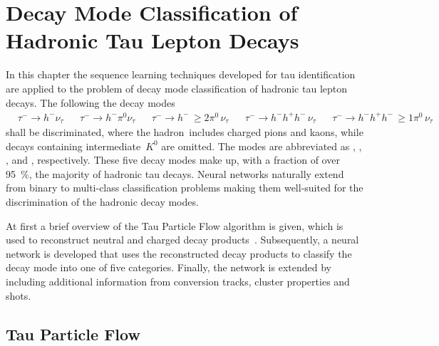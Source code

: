 \chapter{Decay Mode Classification of Hadronic Tau Lepton Decays}
\label{sec:decaymode}

In this chapter the sequence learning techniques developed for tau
identification are applied to the problem of decay mode classification of
hadronic tau lepton decays. The following the decay modes
\begin{align*}
  &\tau^- \to h^- \nu_\tau  & &\tau^- \to h^- \pi^0 \nu_\tau & &\tau^- \to h^- \, {\geq} 2\pi^0 \, \nu_\tau & &\tau^- \to h^- h^+ h^- \, \nu_\tau & &\tau^- \to h^- h^+ h^-\, {\geq} 1 \pi^0 \, \nu_\tau
\end{align*}
shall be discriminated, where the hadron~\hpm includes charged pions and kaons,
while decays containing intermediate~$K^0$ are omitted. The modes are
abbreviated as \hpm, \hpmpi, \hpmpipi, \hhhpm and \hhhpmpi, respectively.
These five decay modes make up, with a fraction of over
\SI{95}{\percent}, the majority of hadronic tau decays.
Neural networks naturally extend from binary to multi-class classification
problems making them well-suited for the discrimination of the hadronic decay
modes.

At first a brief overview of the Tau Particle Flow algorithm is given, which is
used to reconstruct neutral and charged decay products~\cite{bwinter,
  atlas:taurec:decaymodes}. Subsequently, a neural network is developed that
uses the reconstructed decay products to classify the decay mode into one of
five categories. Finally, the network is extended by including additional
information from conversion tracks, cluster properties and shots.

\section{Tau Particle Flow}
\label{sec:tau_pflow}

